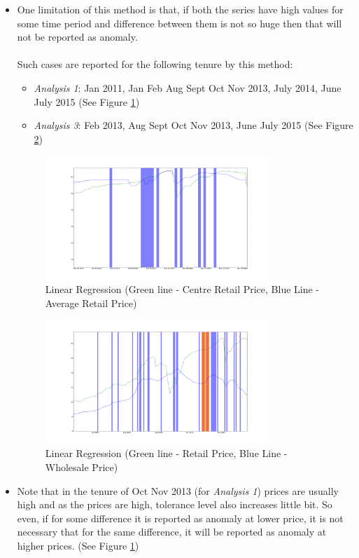 \documentclass[a4paper,10pt]{report}
\begin{document}
\begin{itemize}
			\item One limitation of this method is that, if both the series have high values for some time period and difference between them is not so huge then that will not be reported as anomaly.	\\
			\\
			Such cases are reported for the following tenure by this method:
			\begin{itemize}
				\item \textit{Analysis 1}: Jan 2011, Jan Feb Aug Sept Oct Nov 2013, July 2014, June July 2015 (See Figure \ref{fig:12212})
				\item \textit{Analysis 3}: Feb 2013, Aug Sept Oct Nov 2013, June July 2015 (See Figure \ref{fig:12232})
			\end{itemize}
			\begin{figure}[H]
		    	\centering
  		    	\includegraphics[width=0.8\textwidth]{graphs/12212.png}
		    	\caption{Linear Regression (Green line - Centre Retail Price, Blue Line - Average Retail Price)}
		    	\label{fig:12212}
			\end{figure}
			
			\begin{figure}[H]
		    	\centering
  		    	\includegraphics[width=0.8\textwidth]{graphs/12232.png}
		    	\caption{Linear Regression (Green line - Retail Price, Blue Line - Wholesale Price)}
		    	\label{fig:12232}
			\end{figure}
			
					
			
			\item  Note that in the tenure of Oct Nov 2013 (for \textit{Analysis 1}) prices are usually high and as the prices are high, tolerance level also increases little bit. So even, if for some difference it is reported as anomaly at lower price, it is not necessary that for the same difference, it will be reported as anomaly at higher prices. (See Figure \ref{fig:12212})		
			
		\end{itemize}
		
\end{document}
